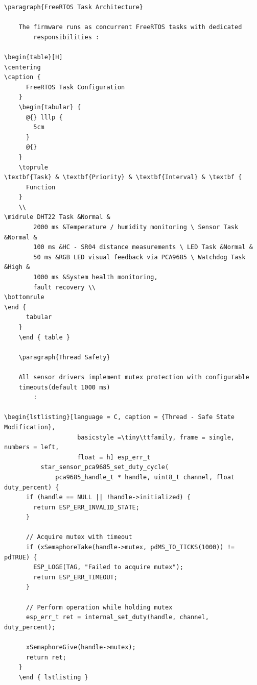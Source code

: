 \begin{lstlisting}[basicstyle =\tiny\ttfamily, frame = single,
                    caption = {ESP32 Firmware Repository Structure},
                    float = h]
    \paragraph{FreeRTOS Task Architecture}

    The firmware runs as concurrent FreeRTOS tasks with dedicated
        responsibilities :

\begin{table}[H]
\centering
\caption {
      FreeRTOS Task Configuration
    }
    \begin{tabular} {
      @{} lllp {
        5cm
      }
      @{}
    }
    \toprule
\textbf{Task} & \textbf{Priority} & \textbf{Interval} & \textbf {
      Function
    }
    \\
\midrule DHT22 Task &Normal &
        2000 ms &Temperature / humidity monitoring \ Sensor Task &Normal &
        100 ms &HC - SR04 distance measurements \ LED Task &Normal &
        50 ms &RGB LED visual feedback via PCA9685 \ Watchdog Task &High &
        1000 ms &System health monitoring,
        fault recovery \\
\bottomrule
\end {
      tabular
    }
    \end { table }

    \paragraph{Thread Safety}

    All sensor drivers implement mutex protection with configurable
    timeouts(default 1000 ms)
        :

\begin{lstlisting}[language = C, caption = {Thread - Safe State Modification},
                    basicstyle =\tiny\ttfamily, frame = single, numbers = left,
                    float = h] esp_err_t
          star_sensor_pca9685_set_duty_cycle(
              pca9685_handle_t * handle, uint8_t channel, float duty_percent) {
      if (handle == NULL || !handle->initialized) {
        return ESP_ERR_INVALID_STATE;
      }

      // Acquire mutex with timeout
      if (xSemaphoreTake(handle->mutex, pdMS_TO_TICKS(1000)) != pdTRUE) {
        ESP_LOGE(TAG, "Failed to acquire mutex");
        return ESP_ERR_TIMEOUT;
      }

      // Perform operation while holding mutex
      esp_err_t ret = internal_set_duty(handle, channel, duty_percent);

      xSemaphoreGive(handle->mutex);
      return ret;
    }
    \end { lstlisting }


\end{lstlisting}

